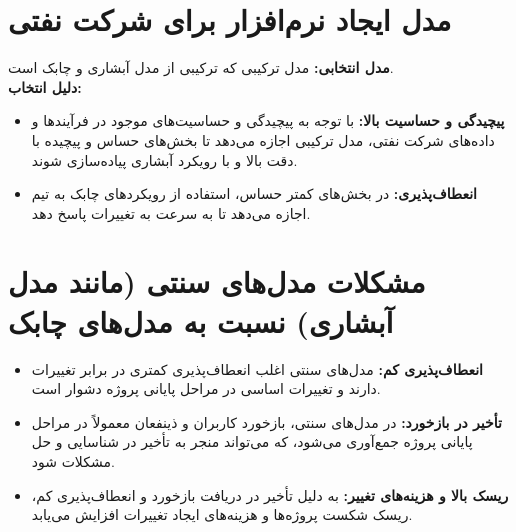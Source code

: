 \section*{ مدل ایجاد نرم‌افزار برای شرکت نفتی}
\textbf{مدل انتخابی:} مدل ترکیبی  که ترکیبی از مدل آبشاری و چابک است. \\
\textbf{دلیل انتخاب:} \\
\begin{itemize}
	\item \textbf{پیچیدگی و حساسیت بالا:} با توجه به پیچیدگی و حساسیت‌های موجود در فرآیندها و داده‌های شرکت نفتی، مدل ترکیبی اجازه می‌دهد تا بخش‌های حساس و پیچیده با دقت بالا و با رویکرد آبشاری پیاده‌سازی شوند.
	\item \textbf{انعطاف‌پذیری:} در بخش‌های کمتر حساس، استفاده از رویکردهای چابک به تیم اجازه می‌دهد تا به سرعت به تغییرات پاسخ دهد.
\end{itemize}

\section*{ مشکلات مدل‌های سنتی (مانند مدل آبشاری) نسبت به مدل‌های چابک}
\begin{itemize}
	\item \textbf{انعطاف‌پذیری کم:} مدل‌های سنتی اغلب انعطاف‌پذیری کمتری در برابر تغییرات دارند و تغییرات اساسی در مراحل پایانی پروژه دشوار است.
	\item \textbf{تأخیر در بازخورد:} در مدل‌های سنتی، بازخورد کاربران و ذینفعان معمولاً در مراحل پایانی پروژه جمع‌آوری می‌شود، که می‌تواند منجر به تأخیر در شناسایی و حل مشکلات شود.
	\item \textbf{ریسک بالا و هزینه‌های تغییر:} به دلیل تأخیر در دریافت بازخورد و انعطاف‌پذیری کم، ریسک شکست پروژه‌ها و هزینه‌های ایجاد تغییرات افزایش می‌یابد.
\end{itemize}